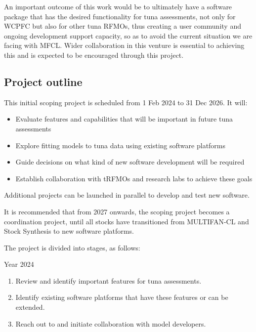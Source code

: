 \documentclass{SCreport}
\begin{document}
An important outcome of this work would be to ultimately have a software package
that has the desired functionality for tuna assessments, not only for WCPFC but
also for other tuna RFMOs, thus creating a user community and ongoing
development support capacity, so as to avoid the current situation we are facing
with MFCL. Wider collaboration in this venture is essential to achieving this
and is expected to be encouraged through this project.

\newpage

\subsection{Project outline}
\label{sec:project-outline}

This initial scoping project is scheduled from 1 Feb 2024 to 31 Dec 2026. It
will:

\begin{itemize}
  \item Evaluate features and capabilities that will be important in future
  tuna assessments\\[-4.5ex]
  \item Explore fitting models to tuna data using existing software
  platforms\\[-4.5ex]
  \item Guide decisions on what kind of new software development will be
  required\\[-4.5ex]
  \item Establish collaboration with tRFMOs and research labs to achieve these
  goals
\end{itemize}

Additional projects can be launched in parallel to develop and test new
software.

It is recommended that from 2027 onwards, the scoping project becomes a
coordination project, until all stocks have transitioned from MULTIFAN-CL and
Stock Synthesis to new software platforms.

The project is divided into stages, as follows:

Year 2024

\begin{enumerate}
  \item Review and identify important features for tuna assessments.\\[-4.5ex]
  \item Identify existing software platforms that have these features or can be
  extended.\\[-4.5ex]
  \item Reach out to and initiate collaboration with model developers.
\end{enumerate}
\end{document}

